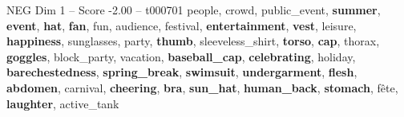 \begin{textsample}{NEG Dim 1 – Score -2.00 – t000701}  \label{ex:f1_neg_006}
people, crowd, public\_event, \textbf{summer}, \textbf{event}, \textbf{hat}, \textbf{fan}, fun, audience, festival, \textbf{entertainment}, \textbf{vest}, leisure, \textbf{happiness}, sunglasses, party, \textbf{thumb}, sleeveless\_shirt, \textbf{torso}, \textbf{cap}, thorax, \textbf{goggles}, block\_party, vacation, \textbf{baseball\_cap}, \textbf{celebrating}, holiday, \textbf{barechestedness}, \textbf{spring\_break}, \textbf{swimsuit}, \textbf{undergarment}, \textbf{flesh}, \textbf{abdomen}, carnival, \textbf{cheering}, \textbf{bra}, \textbf{sun\_hat}, \textbf{human\_back}, \textbf{stomach}, fête, \textbf{laughter}, active\_tank

\end{textsample}
